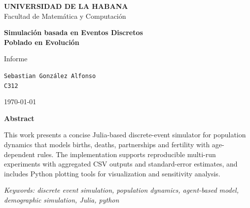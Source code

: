 \documentclass[12pt, a4paper, spanish]{report}
\title{}
\author{}
\date{}
\begin{document}
\begin{titlepage}
    \centering
    \vspace*{1cm}
    
    {\large \textbf{UNIVERSIDAD DE LA HABANA} \\[0.2cm]
    Facultad de Matemática y Computación \\[0.5cm]}
    
    \vspace{2cm}
    
    {\Large \textbf{Simulación basada en Eventos Discretos} \\[0.3cm]
    \textbf{Poblado en Evolución}}
    
    \vspace{2cm}
    
    {\large Informe}
    
    \vspace{3cm}
    
    {\large
    \texttt{Sebastian González Alfonso} \\[0.5cm]
    \texttt{C312} \\[0.5cm]
    }
    
    \vspace{3cm}
    
    \vfill
    
    {\large \today}
    
\end{titlepage}


\textbf{Abstract} 

This work presents a concise Julia-based discrete-event simulator for population dynamics that models births, deaths, partnerships and fertility with age-dependent rules. The implementation supports reproducible multi-run experiments with aggregated CSV outputs and standard-error estimates, and includes Python plotting tools for visualization and sensitivity analysis.


\textit{Keywords: discrete event simulation, population dynamics, agent-based model, demographic simulation, Julia, python}

\vspace{1em}
\end{document}
